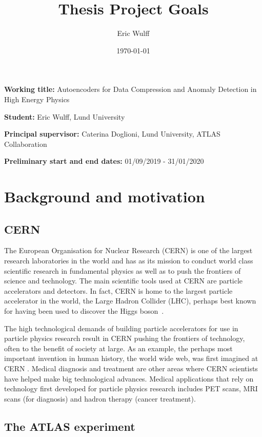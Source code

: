 \documentclass[11pt]{article}
\title{\huge Thesis Project Goals}
\author{Eric Wulff}
\date{\today}
\begin{document}
\maketitle

\textbf{Working title:} Autoencoders for Data Compression and Anomaly Detection in High Energy Physics

\textbf{Student:} Eric Wulff, Lund University

\textbf{Principal supervisor:} Caterina Doglioni, Lund University, ATLAS Collaboration

\textbf{Preliminary start and end dates:} 01/09/2019 - 31/01/2020

\section{Background and motivation}

\subsection{CERN}

The European Organisation for Nuclear Research (CERN) is one of the largest research laboratories in the world and has as its mission to conduct world class scientific research in fundamental physics as well as to push the frontiers of science and technology. The main scientific tools used at CERN are particle accelerators and detectors. In fact, CERN is home to the largest particle accelerator in the world, the Large Hadron Collider (LHC), perhaps best known for having been used to discover the Higgs boson~\cite{higgs_discovery}.

The high technological demands of building particle accelerators for use in particle physics research result in CERN pushing the frontiers of technology, often to the benefit of society at large. As an example, the perhaps most important invention in human history, the world wide web, was first imagined at CERN \cite{www}. Medical diagnosis and treatment are other areas where CERN scientists have helped make big technological advances. Medical applications that rely on technology first developed for particle physics research includes PET scans, MRI scans (for diagnosis) and hadron therapy (cancer treatment).

\subsection{The ATLAS experiment}
\end{document}
